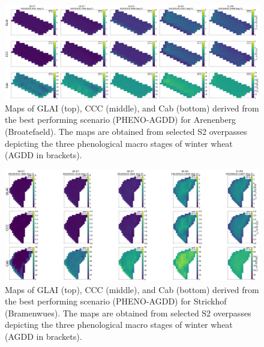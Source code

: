 
\begin{figure}[H]
    \centering
    \includegraphics[width=1\textwidth]{05-Insights/img/Arenenberg_Broatefaeld_Trait_Maps.png}
    \caption[Maps of GLAI (top), CCC (middle), and Cab (bottom) derived from the best performing scenario (PHENO-AGDD) for Arenenberg (Broatefaeld). The maps are obtained from selected S2 overpasses depicting the three phenological macro stages of winter wheat (AGDD in brackets).]{Maps of GLAI (top), CCC (middle), and Cab (bottom) derived from the best performing scenario (PHENO-AGDD) for Arenenberg (Broatefaeld). The maps are obtained from selected S2 overpasses depicting the three phenological macro stages of winter wheat (AGDD in brackets).}
    \label{fig:appendix_arb_broatefaeld_2022}
\end{figure}

\begin{figure}[H]
    \centering
    \includegraphics[width=1\textwidth]{05-Insights/img/Strickhof_Bramenwies_Trait_Maps.png}
    \caption[Maps of GLAI (top), CCC (middle), and Cab (bottom) derived from the best performing scenario (PHENO-AGDD) for Strickhof (Bramenwues). The maps are obtained from selected S2 overpasses depicting the three phenological macro stages of winter wheat (AGDD in brackets).]{Maps of GLAI (top), CCC (middle), and Cab (bottom) derived from the best performing scenario (PHENO-AGDD) for Strickhof (Bramenwues). The maps are obtained from selected S2 overpasses depicting the three phenological macro stages of winter wheat (AGDD in brackets).}
    \label{fig:appendix_sh_bramenwies_2022}
\end{figure}

